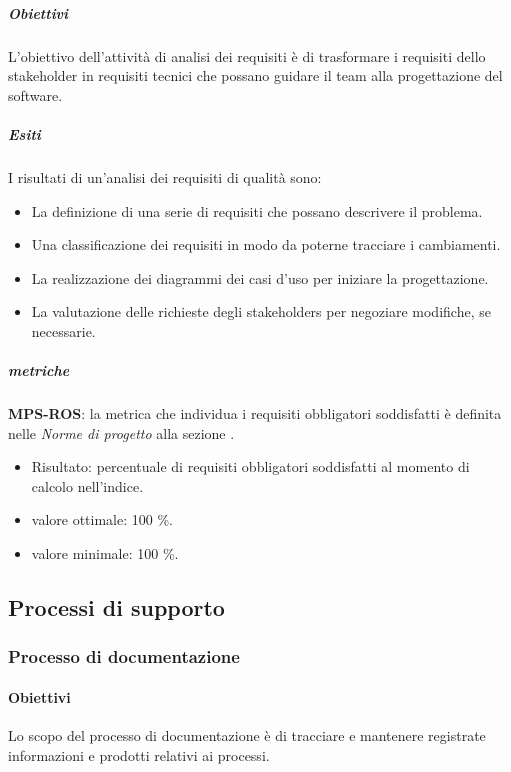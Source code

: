 \documentclass[../piano-di-qualifica.tex]{subfiles}
\begin{document}
\subparagraph{Obiettivi}%
\label{par:obiettivi}
L'obiettivo dell'attività di analisi dei requisiti è di trasformare i requisiti dello stakeholder in requisiti tecnici che possano guidare il team alla progettazione del software.

\subparagraph{Esiti}%
\label{par:esiti}
I risultati di un'analisi dei requisiti di qualità sono:
\begin{itemize}
  \item La definizione di una serie di requisiti che possano descrivere il problema.
  \item Una classificazione dei requisiti in modo da poterne tracciare i cambiamenti.
  \item La realizzazione dei diagrammi dei casi d'uso per iniziare la progettazione.
  \item La valutazione delle richieste degli stakeholders per negoziare modifiche, se necessarie.
\end{itemize}

\subparagraph{metriche}%
\label{par:metriche}

\textbf{MPS-ROS}: la metrica che individua i requisiti obbligatori soddisfatti è definita nelle \textit{Norme di progetto} alla sezione .
\begin{itemize}
  \item Risultato: percentuale di requisiti obbligatori soddisfatti al momento di calcolo nell'indice.
  \item valore ottimale: 100 \%.
  \item valore minimale: 100 \%.
\end{itemize}

\subsection{Processi di supporto}%
\label{sub:processi_di_supporto}

\subsubsection{Processo di documentazione}%
\label{subs:processo_di_documentazione}

\paragraph{Obiettivi}%
\label{par:obiettivi}
Lo scopo del processo di documentazione è di tracciare e mantenere registrate informazioni e prodotti relativi ai processi.
\end{document}
